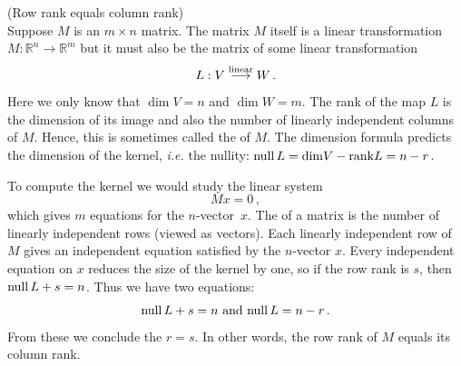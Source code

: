 \begin{example} (Row rank equals column rank)\\
Suppose $M$ is an $m\times n$ matrix. The matrix  $M$ itself is a linear transformation $M:{\mathbb R}^n \rightarrow {\mathbb R}^m$ but it  must also  be the matrix of some linear transformation
\[
L:V\stackrel{\rm linear}\longrightarrow W\, .
\]
Here we only know that $\dim V =n$ and $\dim W =m$. The rank of the map $L$ is the dimension of its image and also the number of linearly independent columns of $M$. Hence, this is sometimes called the  of $M$. The dimension formula predicts  the dimension of the kernel, {\itshape i.e.} the nullity:  $ {\rm null}\, L= {\rm dim}V-{\rm rank}L=n-r$. 

To compute the kernel we would study the linear system \[Mx=0\, ,\] which gives $m$ equations for the $n$-vector~$x$. The  of a matrix is the number of linearly independent rows (viewed as vectors).
Each linearly independent row of $M$ gives an independent equation satisfied by the $n$-vector $x$. Every independent equation on $x$ reduces the size of the kernel by one, so if the row rank is $s$, then ${\rm null}\, L+ s = n$.  Thus we have two equations: 
\[
{\rm null}\, L+s=n \mbox{ and } {\rm null } \, L = n-r\, .
\]
From these we conclude the $r=s$. In other words, the row rank of $M$ equals its column rank.
 \end{example}



